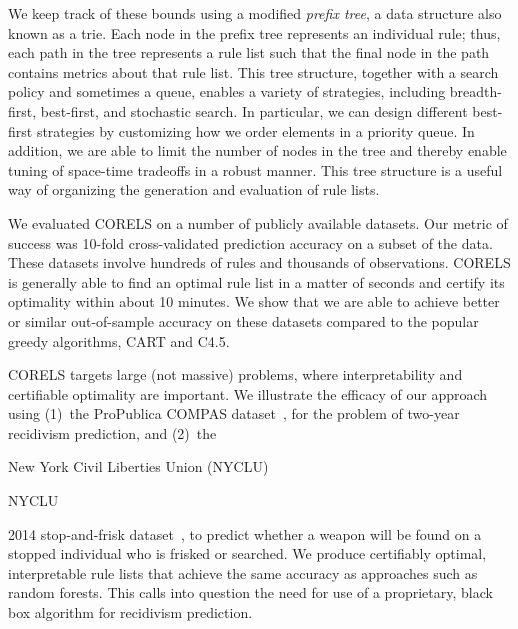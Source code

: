 We keep track of these bounds using a modified \emph{prefix tree},
a data structure also known as a trie.
%
Each node in the prefix tree represents an individual rule;
thus, each path in the tree represents a rule list such that
the final node in the path contains metrics about that rule list.
%
This tree structure, together with a search policy and sometimes a queue,
enables a variety of strategies, including breadth-first,
best-first, and stochastic search.
%
In particular, we can design different best-first strategies
by customizing how we order elements in a priority queue.
%
In addition, we are able to limit the number of nodes in the tree
and thereby enable tuning of space-time tradeoffs in a robust manner.
%
This tree structure is a useful way of organizing the generation
and evaluation of rule lists.

\begin{arxiv}
We evaluated CORELS on a number of publicly available datasets.
%
Our metric of success was 10-fold cross-validated prediction accuracy on a subset of the data.
%
These datasets involve hundreds of rules and thousands of observations.
%
CORELS is generally able to find an optimal rule list in a matter of seconds
and certify its optimality within about 10 minutes.
%
We show that we are able to achieve better or similar out-of-sample accuracy on these
datasets compared to the popular greedy algorithms, CART and C4.5.
\end{arxiv}

CORELS targets large (not massive) problems,
where interpretability and certifiable optimality are important.
%
We illustrate the efficacy of our approach using (1)~the ProPublica COMPAS dataset~\citep{LarsonMaKiAn16}, for the problem of two-year recidivism prediction,
and (2)~the
\begin{kdd}
New York Civil Liberties Union (NYCLU)
\end{kdd}
\begin{arxiv}
NYCLU
\end{arxiv}
2014 stop-and-frisk dataset~\citep{nyclu:2014}, to predict whether a weapon will be found
on a stopped individual who is frisked or searched.
%
We produce certifiably optimal, interpretable rule lists that achieve
the same accuracy as approaches such as random forests.
%
This calls into question the need for use of a proprietary,
black box algorithm for recidivism prediction.

